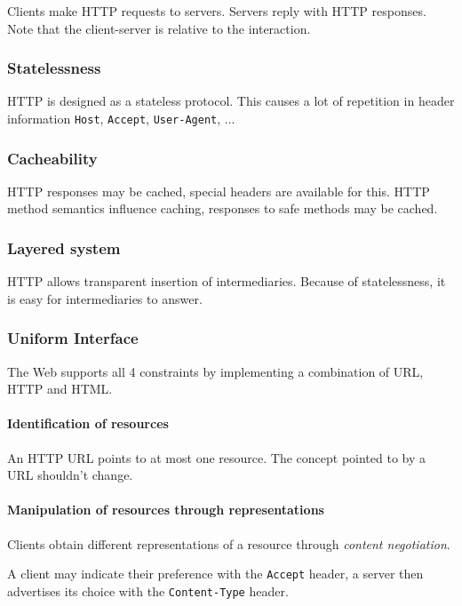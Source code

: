 \documentclass{report}
\begin{document}
Clients make HTTP requests to servers.
Servers reply with HTTP responses.
Note that the client-server is relative to the interaction.

\subsubsection{Statelessness}

HTTP is designed as a stateless protocol.
This causes a lot of repetition in header information
\texttt{Host}, \texttt{Accept}, \texttt{User-Agent}, ...

\subsubsection{Cacheability}

HTTP responses may be cached,
special headers are available for this.
HTTP method semantics influence caching,
responses to safe methods may be cached.

\subsubsection{Layered system}

HTTP allows transparent insertion of intermediaries.
Because of statelessness,
it is easy for intermediaries to answer.

\subsubsection{Uniform Interface}

The Web supports all 4 constraints
by implementing a combination of URL, HTTP and HTML.

\paragraph{Identification of resources}

An HTTP URL points to at most one resource.
The concept pointed to by a URL shouldn't change.

\paragraph{Manipulation of resources through representations}

Clients obtain different representations of a resource
through \emph{content negotiation}.

A client may indicate their preference
with the \texttt{Accept} header,
a server then advertises its choice
with the \texttt{Content-Type} header.
\end{document}
